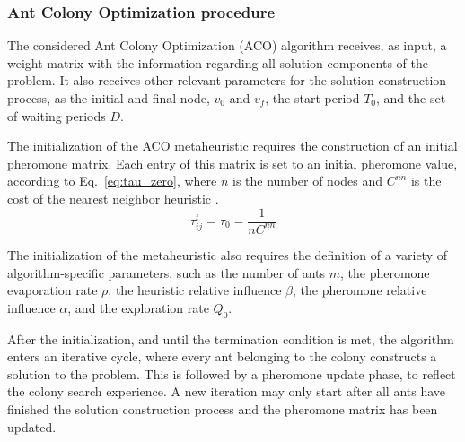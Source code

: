 \subsubsection{Ant Colony Optimization procedure}
\label{sec:aco}

The considered Ant Colony Optimization (ACO) algorithm receives, as input, a weight matrix with the information regarding all solution components of the problem. It also receives other relevant parameters for the solution construction process, as the initial and final node, $v_0$ and $v_f$, the start period $T_0$,  and the set of waiting periods $D$. 

The initialization of the ACO metaheuristic requires the construction of an initial pheromone matrix. Each entry of this matrix is set to an initial pheromone value, according to Eq.~\ref{eq:tau_zero}, where $n$ is the number of nodes and $C^{nn}$ is the cost of the nearest neighbor heuristic \cite{aco_tsp}. 
\begin{equation}
\label{eq:tau_zero}
  \tau_{ij}^{t} = \tau_{0} = \frac{1}{nC^{nn}}
\end{equation}

The initialization of the metaheuristic also requires the definition of a variety of algorithm-specific parameters, such as the number of ants $m$, the pheromone evaporation rate $\rho$, the heuristic relative influence $\beta$, the pheromone relative influence $\alpha$, and the exploration rate $Q_0$. 

After the initialization, and until the termination condition is met, the algorithm enters an iterative cycle, where every ant belonging to the colony constructs a solution to the problem. This is followed by a pheromone update phase, to reflect the colony search experience. A new iteration may only start after all ants have finished the solution construction process and the pheromone matrix has been updated.


